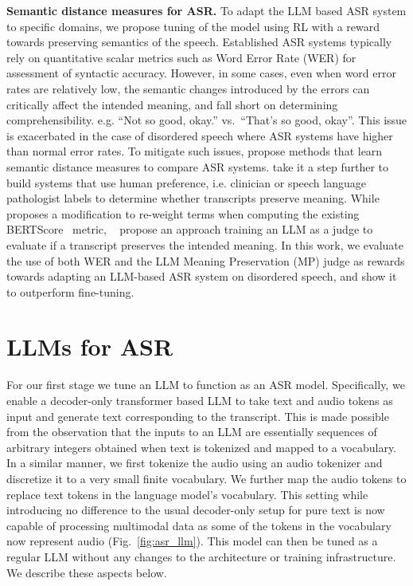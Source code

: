 \documentclass[conference]{IEEEtran}
\begin{document}
\textbf{Semantic distance measures for ASR.} To adapt the LLM based ASR system to specific domains, we propose tuning of the model using RL with a reward towards preserving semantics of the speech. Established ASR systems typically rely on quantitative scalar metrics such as Word Error Rate (WER)   for assessment of syntactic accuracy. However, in some cases, even when word error rates are relatively low, the semantic changes introduced by the errors can critically affect the intended meaning, and fall short on determining comprehensibility. e.g. ``Not so good, okay.'' vs.~``That's so good, okay''.  This issue is exacerbated in the case of disordered speech where ASR systems have higher than normal error rates. To mitigate such issues, \cite{tobin2022assessing,kim2021semantic} propose methods that learn semantic distance measures to compare ASR systems. \cite{shor2023clinical,lattescore_icassp2024} take it a step further to build systems that use human preference, i.e. clinician or speech language pathologist labels to determine whether transcripts preserve meaning.
While \cite{shor2023clinical} %
proposes a modification to re-weight terms when computing the existing BERTScore~\cite{zhang2019bertscore} metric, %
~\cite{lattescore_icassp2024} propose an approach training an LLM as a judge to evaluate if a transcript preserves the intended meaning. In this work, we evaluate the use of both WER and the LLM Meaning Preservation (MP) judge as rewards towards adapting an LLM-based ASR system on disordered speech, and show it to outperform fine-tuning.


\section{LLMs for ASR}

%

For our first stage %
we tune an LLM to function as an ASR model. Specifically, we enable a decoder-only transformer based LLM to take text and audio tokens as input and generate text corresponding to the transcript. This is made possible from the observation that the inputs to an LLM are essentially sequences of arbitrary integers obtained when text is tokenized and mapped to a vocabulary. In a similar manner, we first tokenize the audio using an audio tokenizer and discretize it to a very small finite vocabulary. We further map the audio tokens to replace %
text tokens in the language model's vocabulary. This setting while introducing no difference to the usual decoder-only setup for pure text is now capable of processing multimodal data as some of the tokens in the vocabulary now represent audio (Fig.~\ref{fig:asr_llm}). This model can then be tuned as a regular LLM without any changes to the architecture or training infrastructure. We describe these aspects below. %
\end{document}
